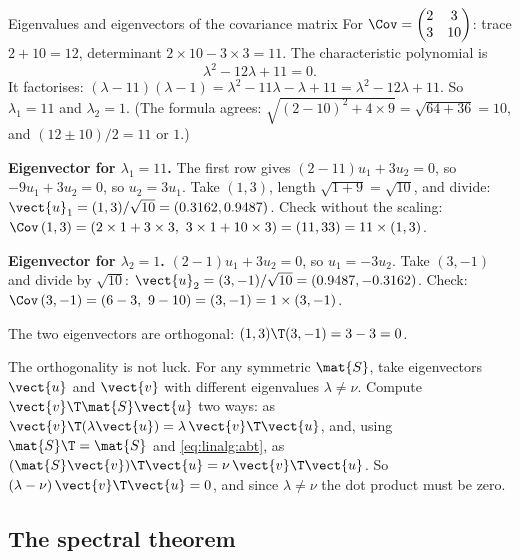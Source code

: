 \begin{worked}[label={we:linalg:eig}]{Eigenvalues and eigenvectors of the covariance matrix}
For $\Cov = \begin{pmatrix} 2 & 3\\ 3 & 10\end{pmatrix}$: trace $2 + 10 = 12$, determinant
$2\times10 - 3\times3 = 11$. The characteristic polynomial is
\[
\lambda^2 - 12\lambda + 11 = 0 .
\]
It factorises: $(\lambda - 11)(\lambda - 1) = \lambda^2 - 11\lambda - \lambda + 11 = \lambda^2 -
12\lambda + 11$. So $\lambda_1 = 11$ and $\lambda_2 = 1$. (The formula agrees:
$\sqrt{(2-10)^2 + 4\times9} = \sqrt{64 + 36} = 10$, and $(12 \pm 10)/2 = 11$ or $1$.)

\textbf{Eigenvector for $\lambda_1 = 11$.} The first row gives
$(2 - 11)u_1 + 3u_2 = 0$, so $-9u_1 + 3u_2 = 0$, so $u_2 = 3u_1$. Take $(1, 3)$, length
$\sqrt{1 + 9} = \sqrt{10}$, and divide: $\vect{u}_1 = (1, 3)/\sqrt{10} = (0.3162, 0.9487)$.
Check without the scaling: $\Cov\,(1, 3) = (2\times1 + 3\times3,\ 3\times1 + 10\times3) = (11, 33)
= 11\times(1, 3)$.

\textbf{Eigenvector for $\lambda_2 = 1$.} $(2 - 1)u_1 + 3u_2 = 0$, so $u_1 = -3u_2$. Take
$(3, -1)$ and divide by $\sqrt{10}$: $\vect{u}_2 = (3, -1)/\sqrt{10} = (0.9487, -0.3162)$.
Check: $\Cov\,(3, -1) = (6 - 3,\ 9 - 10) = (3, -1) = 1\times(3, -1)$.

The two eigenvectors are orthogonal: $(1, 3)\T(3, -1) = 3 - 3 = 0$.
\end{worked}

The orthogonality is not luck. For any symmetric $\mat{S}$, take eigenvectors $\vect{u}$ and
$\vect{v}$ with different eigenvalues $\lambda \ne \nu$. Compute $\vect{v}\T\mat{S}\vect{u}$ two
ways: as $\vect{v}\T(\lambda\vect{u}) = \lambda\,\vect{v}\T\vect{u}$, and, using
$\mat{S}\T = \mat{S}$ and \cref{eq:linalg:abt}, as $(\mat{S}\vect{v})\T\vect{u} =
\nu\,\vect{v}\T\vect{u}$. So $(\lambda - \nu)\,\vect{v}\T\vect{u} = 0$, and since
$\lambda \ne \nu$ the dot product must be zero.

\subsection{The spectral theorem}

